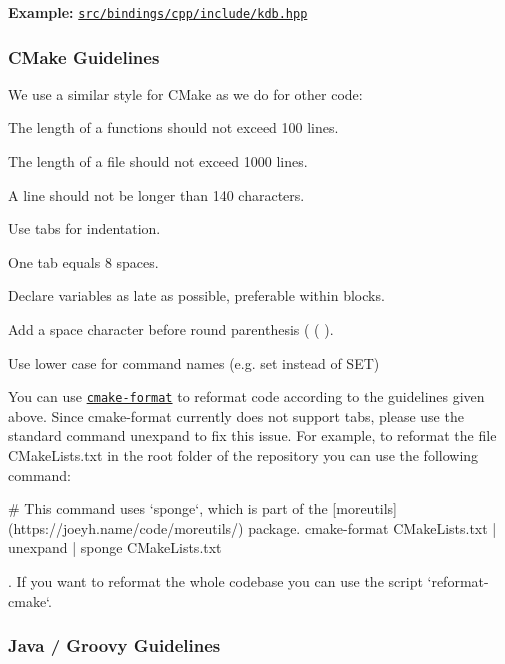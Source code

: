 {\bfseries Example\+:} \href{/home/markus/Projekte/Elektra/current/src/bindings/cpp/include/kdb.hpp}{\tt src/bindings/cpp/include/kdb.\+hpp}

\subsubsection*{C\+Make Guidelines}

We use a similar style for C\+Make as we do for other code\+:


\begin{DoxyItemize}
\item The length of a functions should not exceed 100 lines.
\item The length of a file should not exceed 1000 lines.
\item A line should not be longer than 140 characters.
\item Use tabs for indentation.
\item One tab equals 8 spaces.
\item Declare variables as late as possible, preferable within blocks.
\item Add a space character before round parenthesis ( {\ttfamily (} ).
\item Use lower case for command names (e.\+g. {\ttfamily set} instead of {\ttfamily S\+ET})
\end{DoxyItemize}

You can use \href{https://github.com/cheshirekow/cmake_format}{\tt {\ttfamily cmake-\/format}} to reformat code according to the guidelines given above. Since {\ttfamily cmake-\/format} currently does not support tabs, please use the standard command {\ttfamily unexpand} to fix this issue. For example, to reformat the file {\ttfamily C\+Make\+Lists.\+txt} in the root folder of the repository you can use the following command\+:


\begin{DoxyCode}
# This command uses `sponge`, which is part of the [moreutils](https://joeyh.name/code/moreutils/) package.
cmake-format CMakeLists.txt | unexpand | sponge CMakeLists.txt
\end{DoxyCode}


. If you want to reformat the whole codebase you can use the script `reformat-\/cmake`.

\subsubsection*{Java / Groovy Guidelines}

